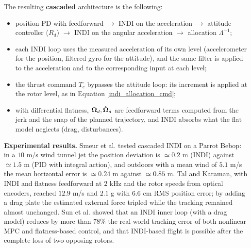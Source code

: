 \documentclass[10pt, a4paper]{report}
\begin{document}
\noindent The resulting \textbf{cascaded} architecture is the following:\begin{itemize}
    \item position PD with feedforward $\to$ INDI on the acceleration $\to$ attitude controller ($R_d$) $\to$ INDI on the angular acceleration $\to$ allocation $\Lambda^{-1}$;
    \item each INDI loop uses the measured acceleration of its own level (accelerometer for the position, filtered gyro for the attitude), and the same filter is applied to the acceleration and to the corresponding input at each level;
    \item the thrust command $T_c$ bypasses the attitude loop: its increment is applied at the rotor level, as in Equation \eqref{indi_allocation_cmd};
    \item with differential flatness, ${\boldsymbol{\Omega}}_d,\dot{{\boldsymbol{\Omega}}}_d$ are feedforward terms computed from the jerk and the snap of the planned trajectory, and INDI absorbs what the flat model neglects (drag, disturbances).
\end{itemize}
\noindent\textbf{Experimental results.} Smeur et al. tested cascaded INDI on a Parrot Bebop: in a $10$ m/s wind tunnel jet the position deviation is $\simeq0.2$ m (INDI) against $\simeq1.5$ m (PID with integral action), and outdoors with a mean wind of $5.1$ m/s the mean horizontal error is $\simeq0.24$ m against $\simeq0.85$ m. Tal and Karaman, with INDI and flatness feedforward at $2$ kHz and the rotor speeds from optical encoders, reached $12.9$ m/s and $2.1$ g with $6.6$ cm RMS position error; by adding a drag plate the estimated external force tripled while the tracking remained almost unchanged. Sun et al. showed that an INDI inner loop (with a drag model) reduces by more than $78\%$ the real-world tracking error of both nonlinear MPC and flatness-based control, and that INDI-based flight is possible after the complete loss of two opposing rotors.\bigskip
\end{document}
